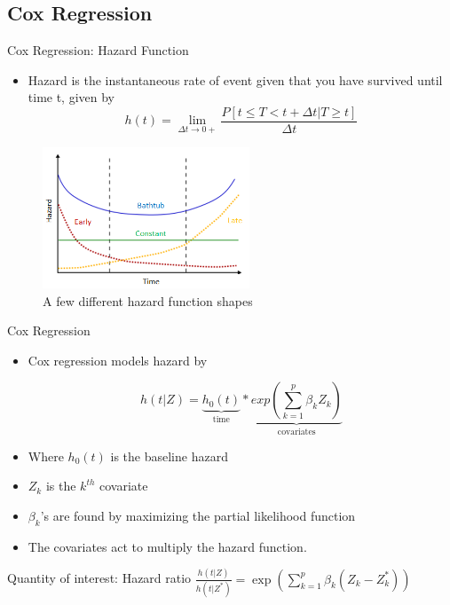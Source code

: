 \subsection{Cox Regression}
\begin{frame}{Cox Regression: Hazard Function}
\begin{itemize}
 \item Hazard is the instantaneous rate of event given that you have survived until time t, given 
 by $$h(t)=\lim_{\Delta t \rightarrow 0+}\frac{P[t\leq T<t+\Delta t|T\geq t]}{\Delta t}$$
\end{itemize}
 \begin{figure}[h!]
  \centering
    \includegraphics[width=0.55\textwidth]{hazard.png}
  \caption{A few different hazard function shapes \cite{wikihazard}}
\label{fig:hazard}
\end{figure}
\end{frame}

\begin{frame}{Cox Regression}
\begin{itemize}
   \item Cox regression models hazard by 
   
   $$h(t|Z)=\underbrace{h_{0}(t)}_{\textrm{time}}*\underbrace{exp(\sum_{k=1}^{p}\beta_{k}Z_{k})}_{\textrm{covariates}}$$

   \item Where $h_{0}(t)$ is the baseline hazard
   \item $Z_k$ is the $k^{th}$ covariate
   \item $\beta_k$'s are found by maximizing the partial likelihood function
\item The covariates act to multiply the hazard function.
\end{itemize}
Quantity of interest: Hazard ratio $\frac{h(t|Z)}{h(t|Z^{*})}=\exp(\sum_{k=1}^{p}\beta_{k}(Z_{k}-Z_{k}^{*}))$
\end{frame}



